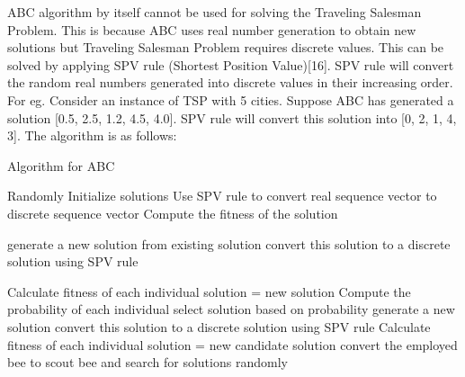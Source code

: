 \documentclass[conference]{IEEEtran}
\begin{document}
ABC algorithm by itself cannot be used for solving the Traveling Salesman Problem. This is because ABC uses real number generation to obtain new solutions but Traveling Salesman Problem requires discrete values. This can be solved by applying SPV rule (Shortest Position Value)[16]. SPV rule will convert the random real numbers generated into discrete values in their increasing order. For eg. Consider an instance of TSP with 5 cities. Suppose ABC has generated  a solution [0.5, 2.5, 1.2, 4.5, 4.0]. SPV rule will convert this solution into [0, 2, 1, 4, 3].  The algorithm is as follows:


\begin{algorithm}[H]
\caption{Algorithm for ABC}
\begin{algorithmic}[1]
\STATE Randomly Initialize solutions
\STATE Use SPV rule to convert real sequence vector to discrete sequence vector
\ENDFOR 
\STATE Compute the fitness of the solution
\ENDFOR 

\REPEAT
{}

\STATE generate a new solution from existing solution
\STATE convert this solution to a discrete solution using SPV rule
\ENDFOR 


\STATE Calculate fitness of each individual
\STATE solution = new solution
\ENDIF
\ENDFOR
\STATE Compute the probability of each individual
\STATE select solution based on probability
\STATE generate a new solution
\STATE convert this solution to a discrete solution using SPV rule
\ENDFOR
\STATE Calculate fitness of each individual
\STATE solution = new candidate solution
\ENDIF
\ENDFOR
{}
\STATE convert the employed bee to scout bee and search for solutions randomly
\ENDIF

\end{algorithmic}
\end{algorithm}
\end{document}
